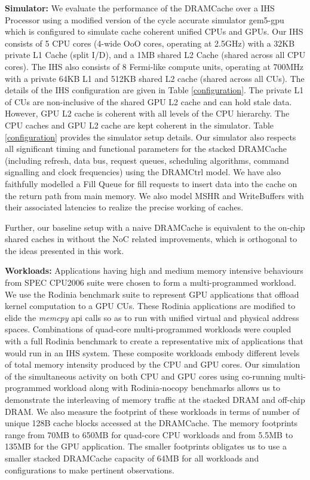 \par \textbf{Simulator:} We evaluate the performance of the DRAMCache over a IHS Processor using a modified version of the cycle accurate simulator gem5-gpu \cite{gem5-gpu} which is configured to simulate cache coherent unified CPUs and GPUs. 
Our IHS consists of 5 CPU cores (4-wide OoO cores, operating at 2.5GHz) with a 32KB private L1 Cache (split I/D), and a 1MB shared L2 Cache (shared across all CPU cores). The IHS also consists of 8 Fermi-like compute units, operating at 700MHz with a private 64KB L1 and 512KB shared L2 cache (shared across all CUs). The details of the IHS configuration are given in Table \ref{configuration}. The private L1 of CUs are non-inclusive of the shared GPU L2 cache and can hold stale data. However, GPU L2 cache is coherent with all levels of the CPU hierarchy. The CPU caches and GPU L2 cache are kept coherent in the simulator. Table \ref{configuration} provides the simulator setup details. 
Our simulator also respects all significant timing and functional parameters for the stacked DRAMCache (including refresh, data bus, request queues, scheduling algorithms, command signalling and clock frequencies) using the DRAMCtrl \cite{dramctrl} model. We have also faithfully modelled  a Fill Queue \cite{dca} for fill requests to insert data into the cache on the return path from main memory. We also model MSHR and WriteBuffers with their associated latencies to realize the precise working of caches. 
\par Further, our baseline setup with a naive DRAMCache is equivalent to the on-chip shared caches in \cite{oscar} without the NoC related improvements, which is orthogonal to the ideas presented in this work.

\par \textbf{Workloads:} Applications having high and medium memory intensive behaviours from SPEC CPU2006 suite \cite{spec2006} were chosen to form a multi-programmed workload. We use the Rodinia benchmark suite \cite{rodinia} to represent GPU applications that offload kernel computation to a GPU CUs. These Rodinia applications are modified to elide the \textit{memcpy} api calls so as to run with unified virtual and physical address spaces. Combinations of quad-core multi-programmed workloads were coupled with a full Rodinia benchmark to create a representative mix of applications that would run in an IHS system. These composite workloads embody different levels of total memory intensity produced by the CPU and GPU cores. Our simulation of the simultaneous activity on both CPU and GPU cores using co-running multi-programmed workload along with Rodinia-nocopy benchmarks allows us to demonstrate the interleaving of memory traffic at the stacked DRAM and off-chip DRAM. We also measure the footprint of these workloads in terms of number of unique 128B cache blocks accessed at the DRAMCache. The memory footprints range from 70MB to 650MB for quad-core CPU workloads and from 5.5MB to 135MB for the GPU application. 
The smaller footprints obligates us to use a smaller stacked DRAMCache capacity of 64MB for all workloads and configurations to make pertinent observations.


